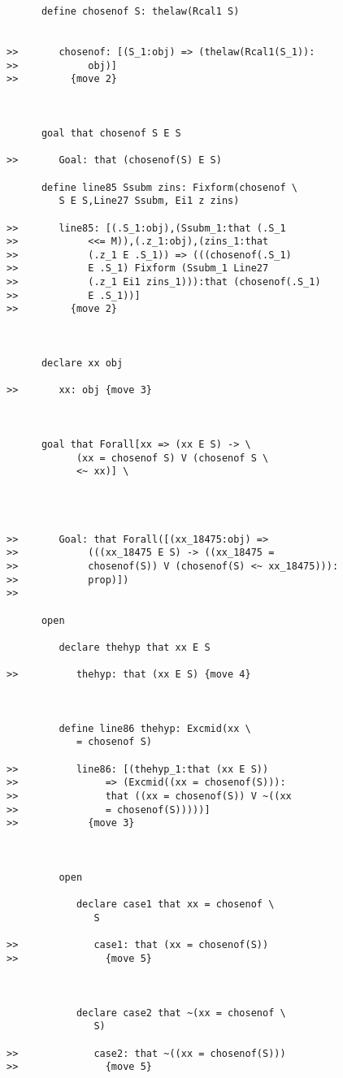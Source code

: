 \documentclass[12pt]{article}
\begin{document}
\begin{verbatim}
      define chosenof S: thelaw(Rcal1 S)


>>       chosenof: [(S_1:obj) => (thelaw(Rcal1(S_1)):
>>            obj)]
>>         {move 2}



      goal that chosenof S E S

>>       Goal: that (chosenof(S) E S)

      define line85 Ssubm zins: Fixform(chosenof \
         S E S,Line27 Ssubm, Ei1 z zins)

>>       line85: [(.S_1:obj),(Ssubm_1:that (.S_1
>>            <<= M)),(.z_1:obj),(zins_1:that
>>            (.z_1 E .S_1)) => (((chosenof(.S_1)
>>            E .S_1) Fixform (Ssubm_1 Line27
>>            (.z_1 Ei1 zins_1))):that (chosenof(.S_1)
>>            E .S_1))]
>>         {move 2}



      declare xx obj

>>       xx: obj {move 3}



      goal that Forall[xx => (xx E S) -> \
            (xx = chosenof S) V (chosenof S \
            <~ xx)] \
         



>>       Goal: that Forall([(xx_18475:obj) =>
>>            (((xx_18475 E S) -> ((xx_18475 =
>>            chosenof(S)) V (chosenof(S) <~ xx_18475))):
>>            prop)])
>>         

      open

         declare thehyp that xx E S

>>          thehyp: that (xx E S) {move 4}



         define line86 thehyp: Excmid(xx \
            = chosenof S)

>>          line86: [(thehyp_1:that (xx E S))
>>               => (Excmid((xx = chosenof(S))):
>>               that ((xx = chosenof(S)) V ~((xx
>>               = chosenof(S)))))]
>>            {move 3}



         open

            declare case1 that xx = chosenof \
               S

>>             case1: that (xx = chosenof(S))
>>               {move 5}



            declare case2 that ~(xx = chosenof \
               S)

>>             case2: that ~((xx = chosenof(S)))
>>               {move 5}




\end{verbatim}
\end{document}
